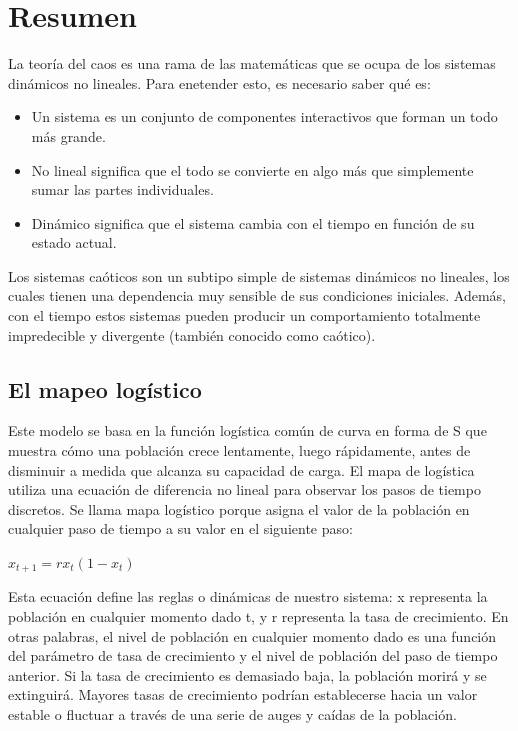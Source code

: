 \documentclass{article}
\begin{document}
\section{Resumen}

La teoría del caos es una rama de las matemáticas que se ocupa de los sistemas dinámicos no lineales. Para enetender esto, es necesario saber qué es:
\begin{itemize}
\item Un sistema es un conjunto de componentes interactivos que forman un todo más grande. 
\item No lineal significa que el todo se convierte en algo más que simplemente sumar las partes individuales.
\item Dinámico significa que el sistema cambia con el tiempo en función de su estado actual.
\end{itemize}
Los sistemas caóticos son un subtipo simple de sistemas dinámicos no lineales, los cuales tienen una dependencia muy sensible de sus condiciones iniciales. Además, con el tiempo estos sistemas pueden producir un comportamiento totalmente impredecible y divergente (también conocido como caótico).

\subsection{El mapeo logístico}
Este modelo se basa en la función logística común de curva en forma de S que muestra cómo una población crece lentamente, luego rápidamente, antes de disminuir a medida que alcanza su capacidad de carga. El mapa de logística utiliza una ecuación de diferencia no lineal para observar los pasos de tiempo discretos. Se llama mapa logístico porque asigna el valor de la población en cualquier paso de tiempo a su valor en el siguiente paso:

\begin{center}
$x_{t+1}=rx_{t}(1-x_{t})$
\end{center}

Esta ecuación define las reglas o dinámicas de nuestro sistema: x representa la población en cualquier momento dado t, y r representa la tasa de crecimiento. En otras palabras, el nivel de población en cualquier momento dado es una función del parámetro de tasa de crecimiento y el nivel de población del paso de tiempo anterior. Si la tasa de crecimiento es demasiado baja, la población morirá y se extinguirá. Mayores tasas de crecimiento podrían establecerse hacia un valor estable o fluctuar a través de una serie de auges y caídas de la población.
\end{document}
